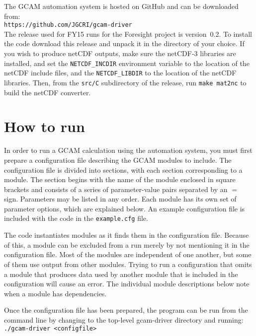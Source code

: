 \documentclass[11pt]{article}
\begin{document}
The GCAM automation system is hosted on GitHub and can be downloaded
from:\\
\texttt{https://github.com/JGCRI/gcam-driver}\\
The release used for FY15 runs for the Foresight project is
version~0.2.  To install the code download this release and unpack it
in the directory of your choice.  If you wish to produce netCDF
outputs, make sure the netCDF-3 libraries are installed, and set the
\texttt{NETCDF\_INCDIR} environment variable to the location of the
netCDF include files, and the \texttt{NETCDF\_LIBDIR} to the location
of the netCDF libraries.  Then, from the \texttt{src/C} subdirectory
of the release, run \texttt{make mat2nc} to build the netCDF
converter.

\section{How to run}

In order to run a GCAM calculation using the automation system, you
must first prepare a configuration file describing the GCAM modules to
include.  The configuration file is divided into sections, with each
section corresponding to a module.  The section begins with the name
of the module enclosed in square brackets and consists of a series of
parameter-value pairs separated by an $=$ sign.  Parameters may be
listed in any order.  Each module has its own set of parameter
options, which are explained below.  An example configuration file is
included with the code in the \texttt{example.cfg} file.

The code instantiates modules as it finds them in the configuration
file.  Because of this, a module can be excluded from a run merely by
not mentioning it in the configuration file.  Most of the modules are
independent of one another, but some of them use output from other
modules.  Trying to run a configuration that omits a module that
produces data used by another module that is included in the
configuration will cause an error.  The individual module descriptions
below note when a module has dependencies.

Once the configuration file has been prepared, the program can be run
from the command line by changing to the 
top-level gcam-driver directory and running:\\
\texttt{./gcam-driver <configfile>}\\ 
\end{document}
